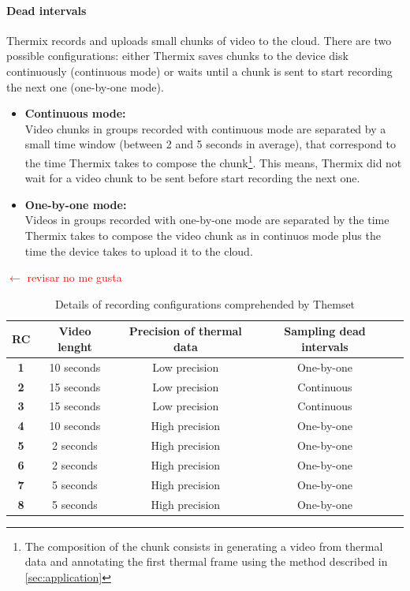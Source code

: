 \documentclass[oneside, twocolumn]{article}
\newcommand\myworries[1]{\textcolor{red}{#1}}
\begin{document}
\paragraph{Dead intervals}
\label{par:time-gap}
Thermix records and uploads small chunks of video to the cloud. There are two possible configurations: either Thermix saves chunks to the device disk continuously (continuous mode) or waits until a chunk is sent to start recording the next one (one-by-one mode).
\begin{itemize}
	\item \textbf{Continuous mode:}\\
		Video chunks in groups recorded with continuous mode are separated by a small time window (between 2 and 5 seconds in average), that correspond to the time Thermix takes to compose the chunk\footnote{The composition of the chunk consists in generating a video from thermal data and annotating the first thermal frame using the method described in \autoref{sec:application}}. This means, Thermix did not wait for a video chunk to be sent before start recording the next one.\\
	\item \textbf{One-by-one mode:}\\
		Videos in groups recorded with one-by-one mode are separated by the time Thermix takes to compose the video chunk as in continuos mode plus the time the device takes to upload it to the cloud.
\end{itemize} \myworries{$\leftarrow$ revisar no me gusta}

\begin{table}[t]
  \centering
\begin{tabular}{c*{4}{c}}
\hline
\textbf{RC} & Video lenght & Precision of thermal data & Sampling dead intervals\\
\hline
\textbf{1} & 10 seconds & Low precision 		& One-by-one \\
\textbf{2} & 15 seconds & Low precision 		& Continuous \\
\textbf{3} & 15 seconds & Low precision 		& Continuous \\
\textbf{4} & 10 seconds & High precision 	& One-by-one \\
\textbf{5} & 2 seconds  & High precision 	& One-by-one \\
\textbf{6} & 2 seconds  & High precision 	& One-by-one \\
\textbf{7} & 5 seconds  & High precision 	& One-by-one \\
\textbf{8} & 5 seconds  & High precision 	& One-by-one \\
\hline
\end{tabular}
  \caption{Details of recording configurations comprehended by Themset}
  \label{tab:1}
\end{table}
\end{document}
